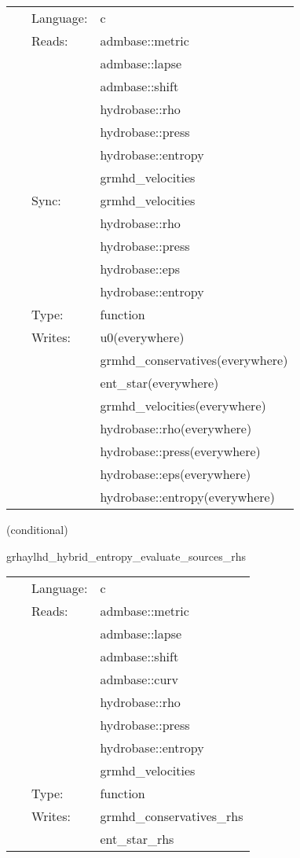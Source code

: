 \documentclass{article}
\begin{document}
 \begin{tabular*}{160mm}{cll} 
~ & Language:  & c \\ 
~ & Reads:  & admbase::metric \\ 
~& ~ &admbase::lapse\\ 
~& ~ &admbase::shift\\ 
~& ~ &hydrobase::rho\\ 
~& ~ &hydrobase::press\\ 
~& ~ &hydrobase::entropy\\ 
~& ~ &grmhd\_velocities\\ 
~ & Sync:  & grmhd\_velocities \\ 
~& ~ &hydrobase::rho\\ 
~& ~ &hydrobase::press\\ 
~& ~ &hydrobase::eps\\ 
~& ~ &hydrobase::entropy\\ 
~ & Type:  & function \\ 
~ & Writes:  & u0(everywhere) \\ 
~& ~ &grmhd\_conservatives(everywhere)\\ 
~& ~ &ent\_star(everywhere)\\ 
~& ~ &grmhd\_velocities(everywhere)\\ 
~& ~ &hydrobase::rho(everywhere)\\ 
~& ~ &hydrobase::press(everywhere)\\ 
~& ~ &hydrobase::eps(everywhere)\\ 
~& ~ &hydrobase::entropy(everywhere)\\ 
\end{tabular*} 


\vspace{5mm}

   (conditional) 

\hspace{5mm} grhaylhd\_hybrid\_entropy\_evaluate\_sources\_rhs 

\hspace{5mm}{\it entropy+hybrid version of grhaylhd\_evaluate\_sources\_rhs } 


\hspace{5mm}

 \begin{tabular*}{160mm}{cll} 
~ & Language:  & c \\ 
~ & Reads:  & admbase::metric \\ 
~& ~ &admbase::lapse\\ 
~& ~ &admbase::shift\\ 
~& ~ &admbase::curv\\ 
~& ~ &hydrobase::rho\\ 
~& ~ &hydrobase::press\\ 
~& ~ &hydrobase::entropy\\ 
~& ~ &grmhd\_velocities\\ 
~ & Type:  & function \\ 
~ & Writes:  & grmhd\_conservatives\_rhs \\ 
~& ~ &ent\_star\_rhs\\ 
\end{tabular*} 
\end{document}
